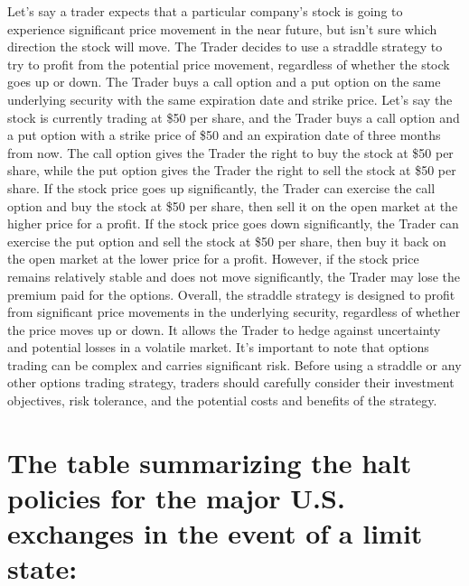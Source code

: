 \documentclass[11pt]{article}
\begin{document}
Let's say a trader expects that a particular company's stock is going to experience significant price movement in the near future,
but isn't sure which direction the stock will move.
The Trader decides to use a straddle strategy to try to profit from the potential price movement, regardless of whether the stock goes up or down.
The Trader buys a call option and a put option on the same underlying security with the same expiration date and strike price.
Let's say the stock is currently trading at \$50 per share, and the Trader buys a call option and a put option with a strike price of \$50
and an expiration date of three months from now. The call option gives the Trader the right to buy the stock at \$50 per share,
while the put option gives the Trader the right to sell the stock at \$50 per share. If the stock price goes up significantly,
the Trader can exercise the call option and buy the stock at \$50 per share, then sell it on the open market at the higher price for a profit.
If the stock price goes down significantly, the Trader can exercise the put option and sell the stock at \$50 per share, then buy it back
on the open market at the lower price for a profit.
However, if the stock price remains relatively stable and does not move significantly, the Trader may lose the premium paid for the options.
Overall, the straddle strategy is designed to profit from significant price movements in the underlying security, regardless of whether the price
moves up or down. It allows the Trader to hedge against uncertainty and potential losses in a volatile market.
It's important to note that options trading can be complex and carries significant risk. Before using a straddle or any other options trading
strategy, traders should carefully consider their investment objectives, risk tolerance, and the potential costs and benefits of the strategy.

\section{The table summarizing the halt policies for the major U.S. exchanges in the event of a limit state:}
\label{sec:orgbadfae4}
\end{document}
